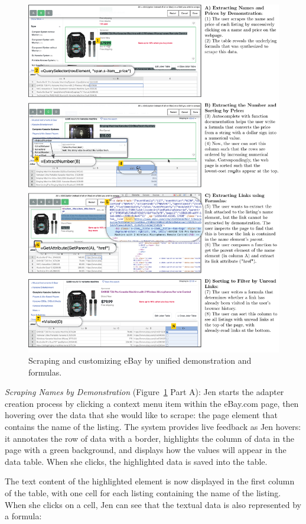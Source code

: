 \documentclass[sigconf,10pt]{acmart}
\begin{document}
\begin{figure}
  \includegraphics[width=\textwidth]{media/ebay.png}
  \caption{\label{fig:ebay}Scraping and customizing eBay by unified demonstration and formulas.}
\end{figure}

\emph{Scraping Names by Demonstration} (Figure~\ref{fig:ebay} Part A):
Jen starts the adapter creation process by clicking a context menu item
within the eBay.com page, then hovering over the data that she would
like to scrape: the page element that contains the name of the listing.
The system provides live feedback as Jen hovers: it annotates the row of
data with a border, highlights the column of data in the page with a
green background, and displays how the values will appear in the data
table. When she clicks, the highlighted data is saved into the table.

The text content of the highlighted element is now displayed in the
first column of the table, with one cell for each listing containing the
name of the listing. When she clicks on a cell, Jen can see that the
textual data is also represented by a formula:
\end{document}
